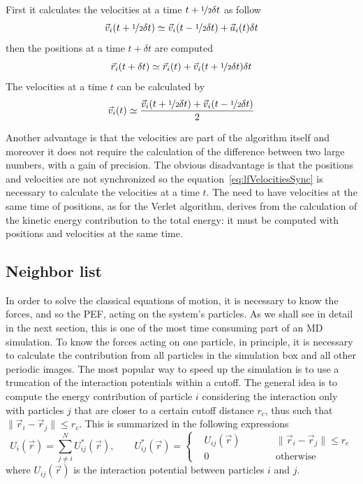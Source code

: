 First it calculates the velocities at a time $t+\nicefrac{1}{2}\delta t$ as follow
\begin{equation*}
	\vec v_i(t + \nicefrac{1}{2}\delta t) \simeq \vec v_i(t - \nicefrac{1}{2}\delta t) + \vec a_i(t)\delta t
\end{equation*}
then the positions at a time $t+\delta t$ are computed
\begin{equation*}
	\vec r_i(t + \delta t) \simeq \vec r_i(t) + \vec v_i(t + \nicefrac{1}{2}\delta t)\delta t
\end{equation*}
The velocities at a time $t$ can be calculated by
\begin{equation}
	\vec v_i(t) \simeq \frac{\vec v_i(t + \nicefrac{1}{2}\delta t) + \vec v_i(t - \nicefrac{1}{2}\delta t)}{2}
	\label{eq:lfVelocitiesSync}
\end{equation}

Another advantage is that the velocities are part of the algorithm itself and moreover it does not require the
calculation of the difference between two large numbers, with a gain of precision. The obvious disadvantage is
that the positions and velocities are not synchronized so the equation~\eqref{eq:lfVelocitiesSync} is necessary
to calculate the velocities at a time $t$. The need to have velocities at the same time of positions, as for the
Verlet algorithm, derives from the calculation of the kinetic energy contribution to the total energy: it must be
computed with positions and velocities at the same time.

\subsection{Neighbor list}
\label{sec:neighbor}
In order to solve the classical equations of motion, it is necessary to know the forces, and so the \ac{PEF},
acting on the system's particles. As we shall see in detail in the next section, this is one of the most time
consuming part of an \ac{MD} simulation. To know the forces acting on one particle, in principle, it is necessary
to calculate the contribution from all particles in the simulation box and all other periodic images. The most
popular way to speed up the simulation is to use a truncation of the interaction potentials within a cutoff. The
general idea is to compute the energy contribution of particle $i$ considering the interaction only with
particles $j$ that are closer to a certain cutoff distance $r_c$, thus such that
$\|\vec r_i - \vec r_j\| \le r_c$. This is summarized in the following expressions
\begin{equation*}
	U_i(\vec r) = \sum_{j\ne i}^N U^*_{ij}(\vec r), \qquad U^*_{ij}(\vec r) = \left \{
	\begin{aligned}
		& U_{ij}(\vec r)& \qquad  &\| \vec r_i - \vec r_j \| \le r_c \\
		& 0			    & \qquad  &\text{otherwise}
	\end{aligned}
	\right .
\end{equation*}
where $U_{ij}(\vec r)$ is the interaction potential between particles $i$ and $j$.

